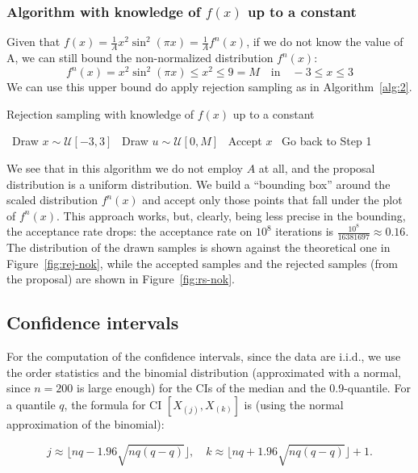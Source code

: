 \documentclass[a4paper]{article}
\begin{document}
\subsubsection*{Algorithm with knowledge of $f(x)$ up to a constant}
Given that $f(x) = \frac{1}{A}x^2\sin^2(\pi x)=\frac{1}{A}f^n(x)$, if
we do not know the value of A, we can still bound the non-normalized
distribution $f^{n}(x)$:
\begin{equation}
  f^n(x) = x^2\sin^2(\pi x) \leq x^2 \leq 9 = M\quad \text{in}\quad
  -3\leq x\leq3
\end{equation}
We can use this upper bound do apply rejection sampling as in
Algorithm~\ref{alg:2}.

\begin{algorithm}
  \caption{Rejection sampling with knowledge of $f(x)$ up to a
  constant}\label{alg:2}
  \begin{algorithmic}[1]
    \STATE~Draw $x \sim \mathcal{U}[-3,3]$
    \STATE~Draw $u \sim \mathcal{U}[0, M]$
    \STATE~Accept $x$
    \ELSE%
    \STATE~Go back to Step 1
    \ENDIF%
  \end{algorithmic}
\end{algorithm}

We see that in this algorithm we do not employ $A$ at all, and the
proposal distribution is a uniform distribution. We build a
``bounding box'' around the scaled distribution $f^n(x)$ and accept
only those points that fall under the plot of $f^n(x)$. This approach
works, but, clearly, being less precise in the bounding, the
acceptance rate drops: the acceptance rate on $10^8$ iterations is
$\frac{10^8}{16381697} \approx 0.16$. The distribution of the drawn
samples is shown against the theoretical one in
Figure~\ref{fig:rej-nok}, while the accepted samples and the
rejected samples (from the proposal) are shown in Figure~\ref{fig:rs-nok}.

\subsection*{Confidence intervals}
For the computation of the confidence intervals, since the data are
i.i.d., we use the order statistics and the binomial distribution
(approximated with a normal, since $n=200$ is large enough) for the
CIs of the median and the 0.9-quantile.
For a quantile $q$, the formula for CI $[X_{(j)},X_{(k)}]$ is (using
the normal approximation of the binomial):

\begin{equation*}
  j \approx \lfloor nq-1.96\sqrt{nq(q-q)} \rfloor, \quad k \approx
  \lfloor nq+1.96\sqrt{nq(q-q)} \rfloor +1.
\end{equation*}
\end{document}
